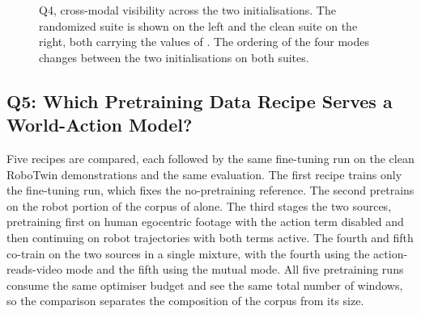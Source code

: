 \begin{figure}[t]
{}
\caption{Q4, cross-modal visibility across the two initialisations. The
randomized suite is shown on the left and the clean suite on the right, both
carrying the values of . The ordering of the four modes changes
between the two initialisations on both suites.}
\label{fig:q4}
\end{figure}

\subsection{Q5: Which Pretraining Data Recipe Serves a World-Action Model?}
\label{sec:q5}

Five recipes are compared, each followed by the same fine-tuning run on the clean
RoboTwin demonstrations and the same evaluation. The first recipe trains only the
fine-tuning run, which fixes the no-pretraining reference. The second pretrains
on the robot portion of the corpus of  alone. The third stages
the two sources, pretraining first on human egocentric footage with the action
term disabled and then continuing on robot trajectories with both terms active.
The fourth and fifth co-train on the two sources in a single mixture, with the
fourth using the action-reads-video mode and the fifth using the mutual mode. All
five pretraining runs consume the same optimiser budget and see the same total
number of windows, so the comparison separates the composition of the corpus from
its size.

